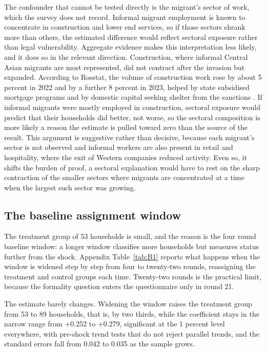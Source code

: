 The confounder that cannot be tested directly is the migrant's sector of work, which the survey does not record. Informal migrant employment is known to concentrate in construction and lower end services, so if those sectors shrank more than others, the estimated difference would reflect sectoral exposure rather than legal vulnerability. Aggregate evidence makes this interpretation less likely, and it does so in the relevant direction. Construction, where informal Central Asian migrants are most represented, did not contract after the invasion but expanded. According to Rosstat, the volume of construction work rose by about 5 percent in 2022 and by a further 8 percent in 2023, helped by state subsidised mortgage programs and by domestic capital seeking shelter from the sanctions \parencite{rosstat}. If informal migrants were mostly employed in construction, sectoral exposure would predict that their households did better, not worse, so the sectoral composition is more likely a reason the estimate is pulled toward zero than the source of the result. This argument is suggestive rather than decisive, because each migrant's sector is not observed and informal workers are also present in retail and hospitality, where the exit of Western companies reduced activity. Even so, it shifts the burden of proof, a sectoral explanation would have to rest on the sharp contraction of the smaller sectors where migrants are concentrated at a time when the largest such sector was growing.

\subsection{The baseline assignment window}\label{sec:8-4}

The treatment group of 53 households is small, and the reason is the four round baseline window: a longer window classifies more households but measures status further from the shock. Appendix Table~\ref{tab:B1} reports what happens when the window is widened step by step from four to twenty-two rounds, reassigning the treatment and control groups each time. Twenty-two rounds is the practical limit, because the formality question enters the questionnaire only in round 21.

The estimate barely changes. Widening the window raises the treatment group from 53 to 89 households, that is, by two thirds, while the coefficient stays in the narrow range from +0.252 to +0.279, significant at the 1 percent level everywhere, with pre-shock trend tests that do not reject parallel trends, and the standard errors fall from 0.042 to 0.035 as the sample grows.

